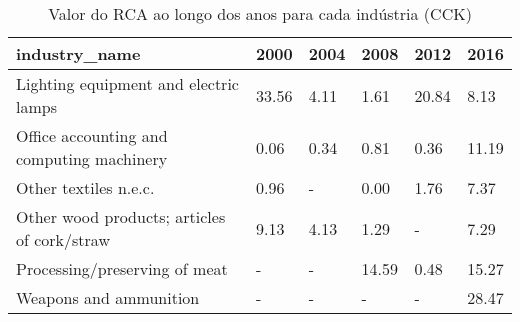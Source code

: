 \begin{table}
\centering
\caption{Valor do RCA ao longo dos anos para cada indústria (CCK)}
\begin{tabular}{p{6cm}p{1.5cm}p{1.5cm}p{1.5cm}p{1.5cm}p{1.5cm}}
\toprule
                              industry\_name &  2000 & 2004 &  2008 &  2012 &  2016 \\
\midrule
      Lighting equipment and electric lamps & 33.56 & 4.11 &  1.61 & 20.84 &  8.13 \\
  Office accounting and computing machinery &  0.06 & 0.34 &  0.81 &  0.36 & 11.19 \\
                      Other textiles n.e.c. &  0.96 &    - &  0.00 &  1.76 &  7.37 \\
Other wood products; articles of cork/straw &  9.13 & 4.13 &  1.29 &     - &  7.29 \\
              Processing/preserving of meat &     - &    - & 14.59 &  0.48 & 15.27 \\
                     Weapons and ammunition &     - &    - &     - &     - & 28.47 \\
\bottomrule
\end{tabular}
\end{table}
